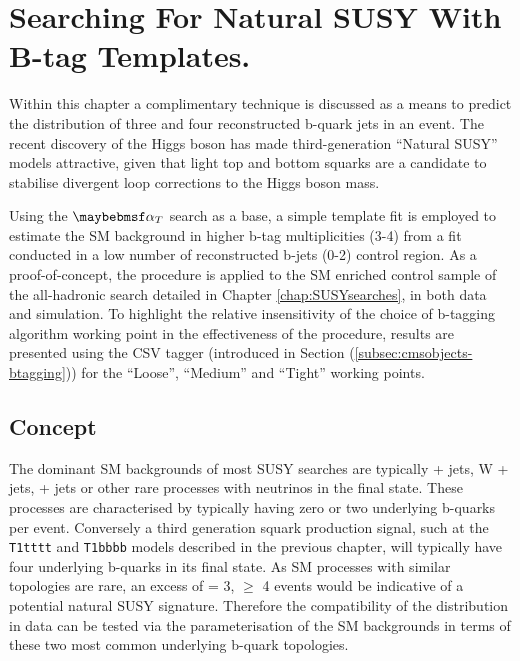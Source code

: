 \chapter{Searching For Natural SUSY With B-tag Templates.}
\label{chap:templatemethod}


Within this chapter a complimentary technique is discussed as a means to predict the distribution of three and four reconstructed b-quark jets in an event. The recent discovery of the Higgs boson has made third-generation ``Natural \ac{SUSY}'' models attractive, given that light top and bottom squarks are a candidate to stabilise divergent loop corrections to the Higgs boson mass.

Using the $\alphat$ search as a base, a simple template fit is employed to estimate the \ac{SM} background in higher b-tag multiplicities (3-4) from a fit conducted in a low number of reconstructed b-jets (0-2) control region. As a proof-of-concept, the procedure is applied to the SM enriched \mupjets control sample of the \alphat all-hadronic search detailed in Chapter \ref{chap:SUSYsearches}, in both data and simulation. To highlight the relative insensitivity of the choice of b-tagging algorithm working point in the effectiveness of the procedure, results are presented using the \ac{CSV} tagger (introduced in Section (\ref{subsec:cmsobjects-btagging})) for the ``Loose'', ``Medium'' and ``Tight'' working points.

\section{Concept}
\label{sec:templateconcept}

The dominant \ac{SM} backgrounds of most \ac{SUSY} searches are typically \ttbar + jets, W + jets, \zinv + jets or other rare processes with neutrinos in the final state. These processes are characterised by typically having zero or two underlying b-quarks per event. Conversely a third generation squark production signal, such at the \texttt{T1tttt} and \texttt{T1bbbb} models described in the previous chapter, will typically have four underlying b-quarks in its final state.  As \ac{SM} processes with similar topologies are rare, an excess of \nbreco = 3, $\geq$ 4 events would be indicative of a potential natural \ac{SUSY} signature. Therefore the compatibility of the \nbreco distribution in data can be tested via the parameterisation of the \ac{SM} backgrounds in terms of these two most common underlying b-quark topologies. 

